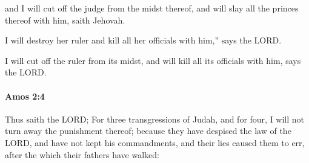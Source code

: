 			\begin{versebox}
					\item[BHS] 
					\item[LXX] 
					\item[ASV] and I will cut off the judge from the midst thereof, and will slay all the princes thereof with him, saith Jehovah.
					\item[NIV] I will destroy her ruler and kill all her officials with him,” says the LORD.
					\item[NRSV] I will cut off the ruler from its midst, and will kill all its officials with him, says the LORD.
			\end{versebox}

		\paragraph{Amos 2:4} %
			\label{AMOS-2-4}

			Thus saith the LORD; For three transgressions of Judah, and for four, I will not turn away the punishment thereof; because they have despised the law of the LORD, and have not kept his commandments, and their lies caused them to err, after the which their fathers have walked:


